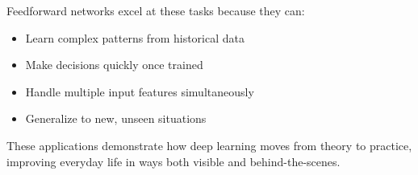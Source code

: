 Feedforward networks excel at these tasks because they can:
\begin{itemize}
    \item Learn complex patterns from historical data
    \item Make decisions quickly once trained
    \item Handle multiple input features simultaneously
    \item Generalize to new, unseen situations
\end{itemize}

These applications demonstrate how deep learning moves from theory to practice, improving everyday life in ways both visible and behind-the-scenes.

